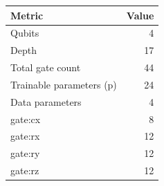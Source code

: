 \begin{tabular}{lr}
\toprule
Metric & Value \\
\midrule
Qubits & 4 \\
Depth & 17 \\
Total gate count & 44 \\
Trainable parameters (p) & 24 \\
Data parameters & 4 \\
  gate:cx & 8 \\
  gate:rx & 12 \\
  gate:ry & 12 \\
  gate:rz & 12 \\
\bottomrule
\end{tabular}
